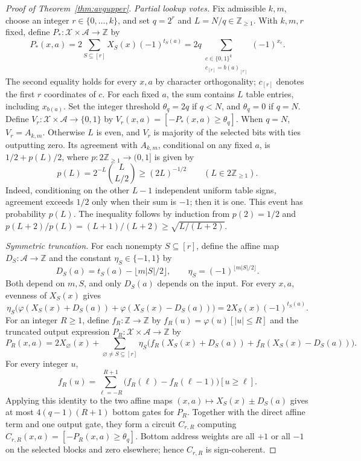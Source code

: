 \documentclass[11pt]{article}
\newcommand{\bits}{\{0,1\}}
\begin{document}
\begin{proof}[Proof of Theorem~\ref{thm:avgupper}]
\emph{Partial lookup votes.}
Fix admissible $k,m$, choose an integer $r\in\{0,\ldots,k\}$, and set
$q=2^r$ and $L=N/q\in\mathbb Z_{\ge1}$.
With $k,m,r$ fixed, define $P_*:\mathcal X\times\mathcal A\to\mathbb Z$ by
$$
P_*(x,a)=2\sum_{S\subseteq[r]}X_S(x)(-1)^{t_S(a)}
 =2q\sum_{\substack{c\in\bits^k\\c_{[r]}=b(a)_{[r]}}}(-1)^{x_c}.
$$
The second equality holds for every $x,a$ by character orthogonality;
$c_{[r]}$ denotes the first $r$ coordinates of $c$.
For each fixed $a$, the sum contains $L$ table entries, including $x_{b(a)}$.
Set the integer threshold $\theta_q=2q$ if $q<N$, and $\theta_q=0$ if
$q=N$. Define $V_r:\mathcal X\times\mathcal A\to\bits$ by
$V_r(x,a)=[-P_*(x,a)\ge\theta_q]$.
When $q=N$, $V_r=A_{k,m}$. Otherwise $L$ is even, and $V_r$ is majority
of the selected bits with ties outputting zero. Its agreement with
$A_{k,m}$, conditional on any fixed $a$, is $1/2+p(L)/2$, where
$p:2\mathbb Z_{\ge1}\to(0,1]$ is given by
$$
p(L)=2^{-L}\binom L{L/2}\ge(2L)^{-1/2}\qquad(L\in2\mathbb Z_{\ge1}).
$$
Indeed, conditioning on the other $L-1$ independent uniform table
signs, agreement exceeds $1/2$ only when their sum is $-1$; then it
is one. This event has probability $p(L)$.
The inequality follows by induction from $p(2)=1/2$ and
$p(L+2)/p(L)=(L+1)/(L+2)\ge\sqrt{L/(L+2)}$.

\emph{Symmetric truncation.}
For each nonempty $S\subseteq[r]$, define the affine map
$D_S:\mathcal A\to\mathbb Z$ and the constant $\eta_S\in\{-1,1\}$ by
$$D_S(a)=t_S(a)-\lfloor m|S|/2\rfloor,\qquad
\eta_S=(-1)^{\lfloor m|S|/2\rfloor}.$$
Both depend on $m,S$, and only $D_S(a)$ depends on the input.
For every $x,a$, evenness of $X_S(x)$ gives
$$
\eta_S\bigl(\varphi(X_S(x)+D_S(a))+\varphi(X_S(x)-D_S(a))\bigr)
 =2X_S(x)(-1)^{t_S(a)}.
$$
For an integer $R\ge1$, define $f_R:\mathbb Z\to\mathbb Z$ by
$f_R(u)=\varphi(u)[|u|\le R]$ and the truncated output expression
$P_R:\mathcal X\times\mathcal A\to\mathbb Z$ by
$$
P_R(x,a)=2X_\varnothing(x)+
\sum_{\varnothing\ne S\subseteq[r]}\eta_S
\bigl(f_R(X_S(x)+D_S(a))+f_R(X_S(x)-D_S(a))\bigr).
$$
For every integer $u$,
$$
f_R(u)=\sum_{\ell=-R}^{R+1}
\bigl(f_R(\ell)-f_R(\ell-1)\bigr)[u\ge\ell].
$$
Applying this identity to the two affine maps
$(x,a)\mapsto X_S(x)\pm D_S(a)$ gives at most $4(q-1)(R+1)$ bottom
gates for $P_R$. Together with the direct affine term and one output
gate, they form a circuit $C_{r,R}$ computing
$C_{r,R}(x,a)=[-P_R(x,a)\ge\theta_q]$.
Bottom address weights are all $+1$ or all $-1$ on the selected blocks
and zero elsewhere; hence $C_{r,R}$ is sign-coherent.


\end{proof}
\end{document}
